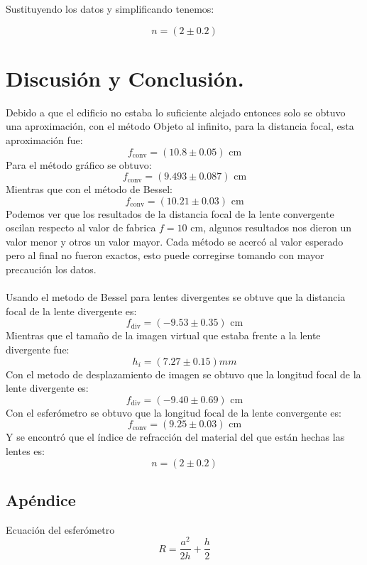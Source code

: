 \documentclass[DIV=calc, paper=a4, fontsize=10pt]{scrartcl}
\begin{document}
Sustituyendo los datos y simplificando tenemos:

\begin{equation*}
    n = (2 \pm 0.2)
\end{equation*}

\section*{\textcolor{carmine}{Discusión y Conclusión.}}
Debido a que el edificio no estaba lo suficiente alejado entonces solo se obtuvo una aproximación, con el método Objeto al infinito, para la distancia focal, esta aproximación fue:
$$ f_{\text{conv}}=(10.8\pm 0.05)\text{ cm} $$
Para el método gráfico se obtuvo:
$$ f_{\text{conv}}=(9.493\pm 0.087)\text{ cm} $$
Mientras que con el método de Bessel:
$$ f_{\text{conv}}=(10.21\pm 0.03)\text{ cm}  $$
Podemos ver que los resultados de la distancia focal de la lente convergente oscilan respecto al valor de fabrica $f=10\text{ cm}$, algunos resultados nos dieron un valor menor y otros un valor mayor. Cada método se acercó al valor esperado pero al final no fueron exactos, esto puede corregirse tomando con mayor precaución los datos.
\\\\
Usando el metodo de Bessel para lentes divergentes se obtuve que la distancia focal de la lente divergente es:
$$ f_{\text{div}}=(-9.53\pm 0.35)\text{ cm} $$
Mientras que el tamaño de la imagen virtual que estaba frente a la lente divergente fue:
$$ h_{i}=(7.27\pm0.15)mm $$
Con el metodo de desplazamiento de imagen se obtuvo que la longitud focal de la lente divergente es:
$$ f_{\text{div}}=(-9.40\pm 0.69)\text{ cm} $$
Con el esferómetro se obtuvo que la longitud focal de la lente convergente es:
$$ f_{\text{conv}}=(9.25\pm 0.03)\text{ cm} $$
Y se encontró que el índice de refracción del material del que están hechas las lentes es:
$$ n=(2\pm0.2) $$
\nocite{*}


\subsection*{\textcolor{carmine}{Apéndice}}
Ecuación del esferómetro
\begin{equation}
    R= \frac{a^2}{2h}+\frac{h}{2}
\end{equation}
\end{document}
